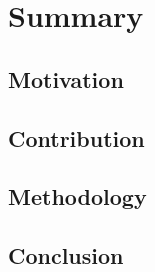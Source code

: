 \section{Summary}



\subsection{Motivation}


\subsection{Contribution}


\subsection{Methodology}


\subsection{Conclusion}
